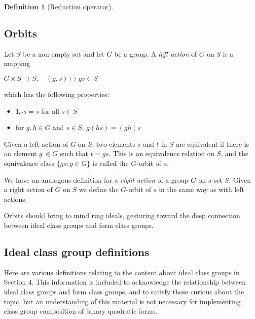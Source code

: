 \documentclass{article}
\theoremstyle{definition}
\newtheorem{definition}{Definition}[section]
\theoremstyle{theorem}
\theoremstyle{example}
\theoremstyle{corollary}
\begin{document}
\begin{definition}[Reduction operator]
\bigskip

\subsection{Orbits}

\bigskip

Let \(S\) be a non-empty set and let \(G\) be a group. A \textit{left action} of \(G\) on \(S\) is a mapping
\begin{center}
\(G \times S \rightarrow S, \quad (g, s) \mapsto gs \in S\)
\end{center}
which has the following properties:
\begin{itemize}
\item \(1_{G} s = s\) for all \(s \in S\)
\item for \(g, h \in G\) and \(s \in S\), \(g(hs) = (gh)s\)
\end{itemize}

\bigskip

Given a left action of \(G\) on \(S\), two elements \(s\) and \(t\) in \(S\) are equivalent if there is an element \(g \ \in G\) such that \(t = gs\). This is an equivalence relation on \(S\), and the equivalence class \(\{gs : g \in G \}\) is called the \(G\)-orbit of \(s\).

\bigskip

We have an analogous definition for a \textit{right action} of a group \(G\) on a set \(S\). Given a right action of \(G\) on \(S\) we define the \(G\)-orbit of \(s\) in the same way as with left actions.

\bigskip

Orbits should bring to mind ring ideals, gesturing toward the deep connection between ideal class groups and form class groups.

\bigskip

\subsection{Ideal class group definitions}

\bigskip

Here are various definitions relating to the content about ideal class groups in Section 4. This information is included to acknowledge the relationship between ideal class groups and form class groups, and to satisfy those curious about the topic, but an understanding of this material is not necessary for implementing class group composition of binary quadratic forms.


\end{definition}
\end{document}
